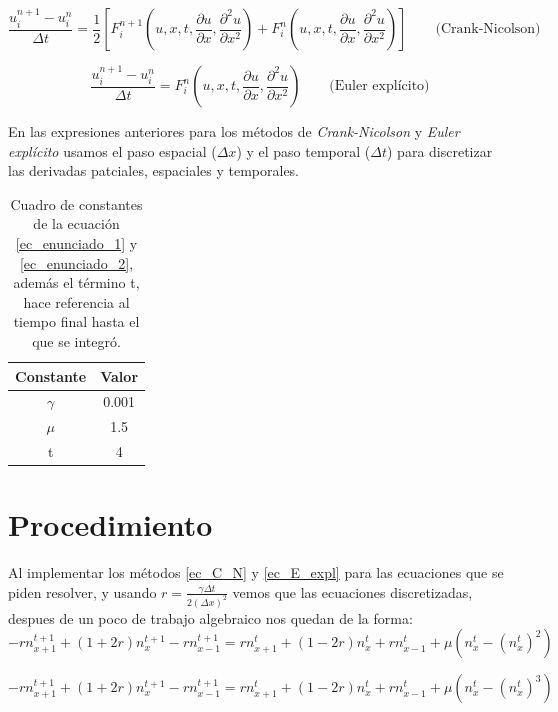 \documentclass[10pt]{article}
\begin{document}
\begin{equation}
\frac{u_{i}^{n + 1} - u_{i}^{n}}{\Delta t} =
\frac{1}{2}\left[
F_{i}^{n + 1}\left(u, x, t, \frac{\partial u}{\partial x}, \frac{\partial^2 u}{\partial x^2}\right) + 
F_{i}^{n}\left(u, x, t, \frac{\partial u}{\partial x}, \frac{\partial^2 u}{\partial x^2}\right)
\right] \qquad \mbox{(Crank-Nicolson)}
\label{ec_C_N}
\end{equation}
  
 
\begin{equation}
\frac{u_{i}^{n + 1} - u_{i}^{n}}{\Delta t} = 
F_{i}^{n}\left(u, x, t, \frac{\partial u}{\partial x}, \frac{\partial^2 u}{\partial x^2}\right) \qquad \mbox{(Euler explícito)}
\label{ec_E_expl}
\end{equation} 

En las expresiones anteriores para los métodos de \textit{Crank-Nicolson} y \textit{Euler explícito} usamos el paso espacial ($\Delta x$) y el paso temporal ($\Delta t$) para discretizar las derivadas patciales, espaciales y temporales.

\begin{table}
\centering
\begin{tabular}{|c|c|}
\hline
Constante & Valor \\
\hline
$\gamma$ & 0.001 \\
\hline
$\mu$ & 1.5 \\
\hline
 t & 4 \\
\hline
\end{tabular}
\caption{Cuadro de constantes de la ecuación \ref{ec_enunciado_1} y \ref{ec_enunciado_2}, además el término t, hace referencia al tiempo final hasta el que se integró.}
\label{tab_valores}
\end{table}

\section{Procedimiento}
  Al implementar los métodos \ref{ec_C_N} y \ref{ec_E_expl} para las ecuaciones que se piden resolver, y usando $r = \frac{\gamma \Delta t}{2 (\Delta x)^2}$ vemos que las ecuaciones discretizadas, despues de un poco de trabajo algebraico nos quedan de la forma:
 $$-r n_{x + 1}^{t + 1} + (1 + 2 r)n_{x}^{t + 1} - r n_{x - 1}^{t + 1} = r n_{x + 1}^{t} + (1 - 2 r)n_{x}^{t} + r n_{x - 1}^{t} +\mu (n_{x}^{t} -(n_{x}^{t})^2)$$

 $$-r n_{x + 1}^{t + 1} + (1 + 2 r)n_{x}^{t + 1} - r n_{x - 1}^{t + 1} = r n_{x + 1}^{t} + (1 - 2 r)n_{x}^{t} + r n_{x - 1}^{t} +\mu (n_{x}^{t} -(n_{x}^{t})^3)$$
 
\end{document}
